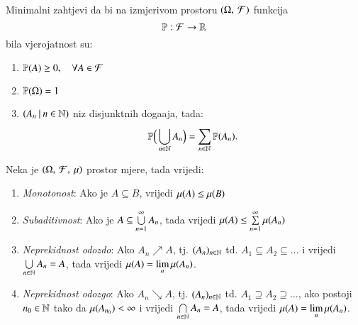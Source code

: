 \begin{nap}
\begin{enumerate}[label=(\alph*)]
        Minimalni zahtjevi da bi na izmjerivom prostoru $(\Omega, \: \mathcal{F})$ funkcija
        \begin{equation*}
            \mathbb{P}: \mathcal{F} \to \mathbb{R}
        \end{equation*}
        bila vjerojatnost su:
        \begin{enumerate}[label=(\roman*)]
            \item $\mathbb{P}({A}) \geq 0, \quad \forall A \in \mathcal{F}$
            \item $\mathbb{P}({\Omega}) = 1$
            \item $({A_n} \: | \: {n \in \mathbb{N}})$ niz disjunktnih doga\dj aja, tada:
            \begin{equation*}
                \mathbb{P} \Big( \bigcup\limits_{n \in \mathbb{N}}^{} A_n \Big) = \sum\limits_{n \in \mathbb{N}}^{} \mathbb{P}({A_n}).
            \end{equation*}
        \end{enumerate}
    \end{enumerate}
\end{nap}

\begin{tm} \label{tm:1.24-1}
    Neka je $(\Omega, \: \mathcal{F}, \: \mu)$ prostor mjere, tada vrijedi:
    \begin{enumerate}[label={(\roman*)}]
        \item \label{tm:1.24-1.1}
        \emph{Monotonost}: Ako je $A \subseteq B$, vrijedi 
            $\mu({A}) \leq \mu({B})$
        \item \emph{Subaditivnost}: Ako je $A \subseteq \bigcup\limits_{n=1}^{\infty} A_n$, tada
            vrijedi $\mu({A}) \leq \sum\limits_{n=1}^{\infty} \mu({A_n})$
        \item \label{tm:1.24-1.3}
        \emph{Neprekidnost odozdo}: Ako $A_n \nearrow A$, 
            tj. $(A_n)_{n \in \mathbb{N}}$ td. $A_1 \subseteq A_2 \subseteq \dots$ i vrijedi
            $\bigcup\limits_{n \in \mathbb{N}}^{} A_n = A$, tada vrijedi $\mu({A}) =
            \lim\limits_{n} \mu({A_n})$.
        \item \emph{Neprekidnost odozgo}: Ako $A_n \searrow A$, tj. $(A_n)_{n \in \mathbb{N}}$ td.
            $A_1 \supseteq A_2 \supseteq \dots$, ako postoji $n_0 \in \mathbb{N}$ tako da
            $\mu({A_{n_0}}) < \infty$ i vrijedi $\bigcap\limits_{n \in \mathbb{N}}^{} A_n = A$,
            tada vrijedi $\mu({A}) = \lim\limits_{n} \mu({A_n})$.
    \end{enumerate}
\end{tm}

